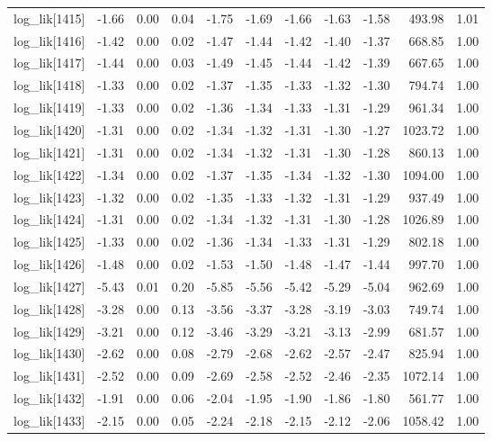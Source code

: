 \begin{table}[ht]
\begin{tabular}{rrrrrrrrrrr}
  log\_lik[1415] & -1.66 & 0.00 & 0.04 & -1.75 & -1.69 & -1.66 & -1.63 & -1.58 & 493.98 & 1.01 \\ 
  log\_lik[1416] & -1.42 & 0.00 & 0.02 & -1.47 & -1.44 & -1.42 & -1.40 & -1.37 & 668.85 & 1.00 \\ 
  log\_lik[1417] & -1.44 & 0.00 & 0.03 & -1.49 & -1.45 & -1.44 & -1.42 & -1.39 & 667.65 & 1.00 \\ 
  log\_lik[1418] & -1.33 & 0.00 & 0.02 & -1.37 & -1.35 & -1.33 & -1.32 & -1.30 & 794.74 & 1.00 \\ 
  log\_lik[1419] & -1.33 & 0.00 & 0.02 & -1.36 & -1.34 & -1.33 & -1.31 & -1.29 & 961.34 & 1.00 \\ 
  log\_lik[1420] & -1.31 & 0.00 & 0.02 & -1.34 & -1.32 & -1.31 & -1.30 & -1.27 & 1023.72 & 1.00 \\ 
  log\_lik[1421] & -1.31 & 0.00 & 0.02 & -1.34 & -1.32 & -1.31 & -1.30 & -1.28 & 860.13 & 1.00 \\ 
  log\_lik[1422] & -1.34 & 0.00 & 0.02 & -1.37 & -1.35 & -1.34 & -1.32 & -1.30 & 1094.00 & 1.00 \\ 
  log\_lik[1423] & -1.32 & 0.00 & 0.02 & -1.35 & -1.33 & -1.32 & -1.31 & -1.29 & 937.49 & 1.00 \\ 
  log\_lik[1424] & -1.31 & 0.00 & 0.02 & -1.34 & -1.32 & -1.31 & -1.30 & -1.28 & 1026.89 & 1.00 \\ 
  log\_lik[1425] & -1.33 & 0.00 & 0.02 & -1.36 & -1.34 & -1.33 & -1.31 & -1.29 & 802.18 & 1.00 \\ 
  log\_lik[1426] & -1.48 & 0.00 & 0.02 & -1.53 & -1.50 & -1.48 & -1.47 & -1.44 & 997.70 & 1.00 \\ 
  log\_lik[1427] & -5.43 & 0.01 & 0.20 & -5.85 & -5.56 & -5.42 & -5.29 & -5.04 & 962.69 & 1.00 \\ 
  log\_lik[1428] & -3.28 & 0.00 & 0.13 & -3.56 & -3.37 & -3.28 & -3.19 & -3.03 & 749.74 & 1.00 \\ 
  log\_lik[1429] & -3.21 & 0.00 & 0.12 & -3.46 & -3.29 & -3.21 & -3.13 & -2.99 & 681.57 & 1.00 \\ 
  log\_lik[1430] & -2.62 & 0.00 & 0.08 & -2.79 & -2.68 & -2.62 & -2.57 & -2.47 & 825.94 & 1.00 \\ 
  log\_lik[1431] & -2.52 & 0.00 & 0.09 & -2.69 & -2.58 & -2.52 & -2.46 & -2.35 & 1072.14 & 1.00 \\ 
  log\_lik[1432] & -1.91 & 0.00 & 0.06 & -2.04 & -1.95 & -1.90 & -1.86 & -1.80 & 561.77 & 1.00 \\ 
  log\_lik[1433] & -2.15 & 0.00 & 0.05 & -2.24 & -2.18 & -2.15 & -2.12 & -2.06 & 1058.42 & 1.00 \\ 

\end{tabular}
\end{table}
